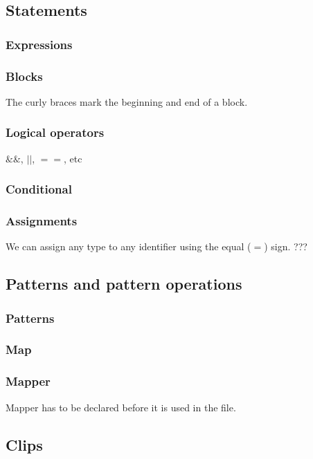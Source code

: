 \documentclass[11pt,twoside]{article}
\begin{document}
\subsection{Statements}

\subsubsection{Expressions}


\subsubsection{Blocks}
The curly braces mark the beginning and end of a block.

\subsubsection{Logical operators}
$\&\&$, $||$, $==$, etc


\subsubsection{Conditional}


\subsubsection{Assignments}
We can assign any type to any identifier using the equal ($=$) sign.
???

\subsection{Patterns and pattern operations}

\subsubsection{Patterns}

\subsubsection{Map}

\subsubsection{Mapper}
Mapper has to be declared before it is used in the file.

\subsection{Clips}
\end{document}
